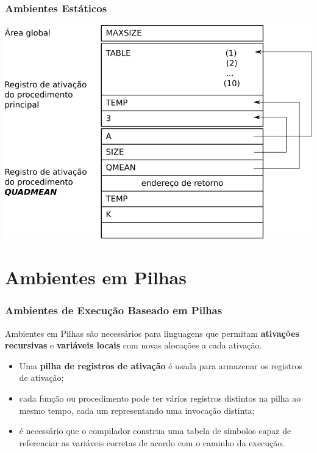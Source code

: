 \documentclass[table]{beamer}
\begin{document}
\begin{frame}
   \frametitle{Ambientes Estáticos}
   \includegraphics[width=\linewidth,height=\textheight,keepaspectratio]{figuras/ambienteestaticoativacao.png}
\end{frame}

\section{Ambientes em Pilhas}
\begin{frame}
   \frametitle{Ambientes de Execução Baseado em Pilhas}
   Ambientes em Pilhas são necessários para linguagens que permitam \textbf{ativações recursivas} e \textbf{variáveis locais} com novas alocações a cada ativação.
   \begin{itemize}
      \item Uma \textbf{pilha de registros de ativação} é usada para armazenar os registros de ativação;
      \item cada função ou procedimento pode ter vários registros distintos na pilha ao mesmo tempo, cada um representando uma invocação distinta;
      \item é necessário que o compilador construa uma tabela de símbolos capaz de referenciar as variáveis corretas de acordo com o caminho da execução.
   \end{itemize}
\end{frame}
\end{document}
